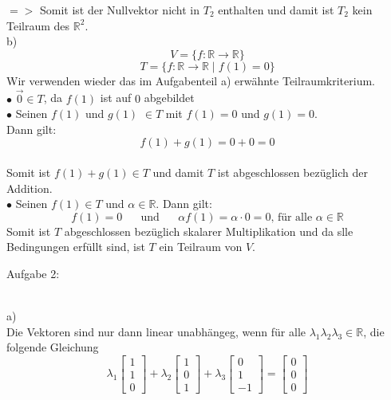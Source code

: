 \documentclass[11pt]{article}
\begin{document}
				$=>$ Somit ist der Nullvektor nicht in $T_2$ enthalten und damit ist $T_2$ kein Teilraum des $\mathbb{R}^2$.\\
\newpage
			\indent b)\\
				$$V=\{f: \mathbb{R} \longrightarrow \mathbb{R}\}$$
				$$T=\{f: \mathbb{R} \longrightarrow \mathbb{R} \mid f(1)=0\}$$
				Wir verwenden wieder das im Aufgabenteil a) erwähnte Teilraumkriterium.\\
				\indent $\bullet$ $\vec{0} \in T$, da $f(1)$ ist auf $0$ abgebildet\\
				\indent $\bullet$ Seinen $f(1)$ und $g(1)$ $\in T$ mit $f(1)=0$ und $g(1)=0$.\\
				Dann gilt: $$f(1)+g(1)= 0+0=0$$\\
				Somit ist $f(1)+g(1) \in T$ und damit $T$ ist abgeschlossen bezüglich der Addition.\\
				\indent $\bullet$ Seinen $f(1) \in T$ und $\alpha \in \mathbb{R}$. Dann gilt:\\
				$$f(1)=0 \hspace{20pt} \text{und} \hspace{20pt} \alpha f(1)= \alpha \cdot 0 = 0 \text{, für alle } \alpha \in \mathbb{R}$$
				Somit ist $T$ abgeschlossen bezüglich skalarer Multiplikation und da slle Bedingungen erfüllt sind, ist $T$ ein Teilraum von $V$.\\
		\noindent \begin{Large}Aufgabe 2:\end{Large}\\[2pt]
			\indent a)\\
				Die Vektoren sind nur dann linear unabhängeg, wenn für alle $\lambda_1 \lambda_2 \lambda_3 \in \mathbb{R}$, die folgende Gleichung\\
				$$\lambda_1 \begin{bmatrix}1\\1\\0\end{bmatrix} +
				\lambda_2 \begin{bmatrix}1\\0\\1\end{bmatrix} +
				\lambda_3 \begin{bmatrix}0\\1\\-1\end{bmatrix} = \begin{bmatrix}0\\0\\0\end{bmatrix}$$
\end{document}
